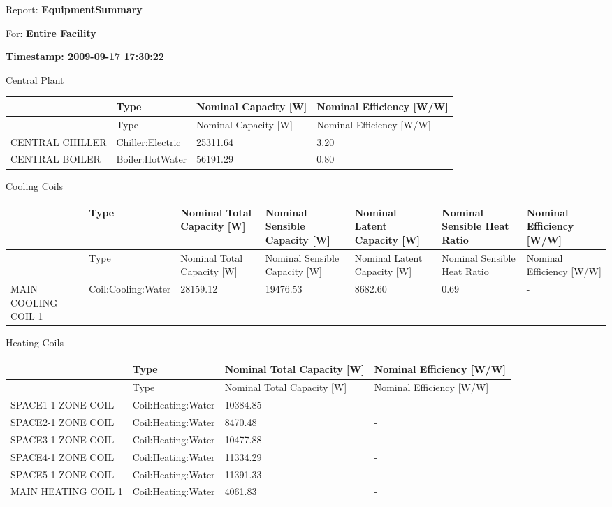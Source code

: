 Report: \textbf{EquipmentSummary}

For: \textbf{Entire Facility}

\textbf{Timestamp: 2009-09-17 17:30:22}

Central Plant

\begin{longtable}[c]{p{1.5in}p{1.5in}p{1.5in}p{1.5in}}
\toprule 
~ & Type & Nominal Capacity [W] & Nominal Efficiency [W/W] \tabularnewline
\midrule
\endfirsthead

\toprule 
~ & Type & Nominal Capacity [W] & Nominal Efficiency [W/W] \tabularnewline
\midrule
\endhead

CENTRAL CHILLER & Chiller:Electric & 25311.64 & 3.20 \tabularnewline
CENTRAL BOILER & Boiler:HotWater & 56191.29 & 0.80 \tabularnewline
\bottomrule
\end{longtable}

Cooling Coils

\begin{longtable}[c]{p{0.85in}p{0.85in}p{0.85in}p{0.85in}p{0.85in}p{0.85in}p{0.85in}}
\toprule 
~ & Type & Nominal Total Capacity [W] & Nominal Sensible Capacity [W] & Nominal Latent Capacity [W] & Nominal Sensible Heat Ratio & Nominal Efficiency [W/W] \tabularnewline
\midrule
\endfirsthead

\toprule 
~ & Type & Nominal Total Capacity [W] & Nominal Sensible Capacity [W] & Nominal Latent Capacity [W] & Nominal Sensible Heat Ratio & Nominal Efficiency [W/W] \tabularnewline
\midrule
\endhead

MAIN COOLING COIL 1 & Coil:Cooling:Water & 28159.12 & 19476.53 & 8682.60 & 0.69 & - \tabularnewline
\bottomrule
\end{longtable}

Heating Coils

\begin{longtable}[c]{p{1.5in}p{1.5in}p{1.5in}p{1.5in}}
\toprule 
~ & Type & Nominal Total Capacity [W] & Nominal Efficiency [W/W] \tabularnewline
\midrule
\endfirsthead

\toprule 
~ & Type & Nominal Total Capacity [W] & Nominal Efficiency [W/W] \tabularnewline
\midrule
\endhead

SPACE1-1 ZONE COIL & Coil:Heating:Water & 10384.85 & - \tabularnewline
SPACE2-1 ZONE COIL & Coil:Heating:Water & 8470.48 & - \tabularnewline
SPACE3-1 ZONE COIL & Coil:Heating:Water & 10477.88 & - \tabularnewline
SPACE4-1 ZONE COIL & Coil:Heating:Water & 11334.29 & - \tabularnewline
SPACE5-1 ZONE COIL & Coil:Heating:Water & 11391.33 & - \tabularnewline
MAIN HEATING COIL 1 & Coil:Heating:Water & 4061.83 & - \tabularnewline
\bottomrule
\end{longtable}

